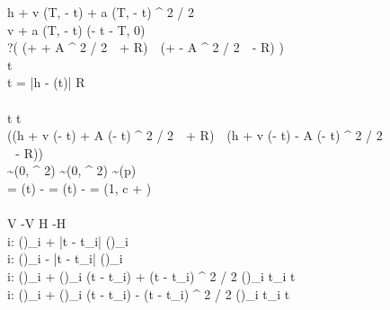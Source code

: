 \begin{figure}
\begin{center}
\begin{sllisting}
      \slind \cahnext \dlassign h + v \cdot \min(T, \catm - t) + a \cdot \min(T, \catm - t) ^ 2 / 2 \seq \\
      \slind
        \cavnext \dlassign v + a \cdot \min(T, \catm - t) \seq
        \catleftnext \dlassign \max(\catm - t - T, 0) \seq \\
      \slind  ?(
        (\cahnext + \cavnext \cdot \catleftnext + A \cdot \catleftnext ^ 2 / 2 \,\geq\, \cahmintmax + R)
        \,\lor\,
        (\cahnext + \cavnext \cdot \catleftnext - A \cdot \catleftnext ^ 2 / 2 \,\leq\, \cahmintmin - R)
      )\\
    \slplant
      \catinit \dlassign t \seq {} \\
    \slsafe
      t = \catm \rightarrow |h - \cahint(t)| \geq R \\
    \slinvariant \\
      \slind t  \land t \leq \catm \ \land \\
      \slind ((h + v \cdot (\catm - t) + A \cdot (\catm - t) ^ 2 / 2 \,\geq\, \cahmintmax + R) \,\lor\,
      (h + v \cdot (\catm - t) - A \cdot (\catm - t) ^ 2 / 2 \,\leq\, \cahmintmin - R)) \\
    \slnoise
      \caEtaOne \sim \slnormal(0, \caSigmaOne ^ 2) \commasep
      \caEtaTwo \sim \slnormal(0, \caSigmaTwo ^ 2) \commasep
      \caEtaThree \sim \slbernouilli(p) \\
    \slobserve
      \caOmegaOne = \cavint(t) - \caEtaOne \commasep
      \caOmegaTwo = \cahint(t) - \caEtaTwo \commasep
      \caOmegaThree = \min(1, c + \caEtaThree) \\
    \slinfer \\
      \slind \cavintmax \slassign V \seq  \cavintmin \slassign -V \seq  \cahintmax \slassign H \seq  \cahintmin \slassign -H \seq \\
      \slind  \cavintmax \slassign \slaggregate i: (\caOmegaOne)_i + \caAint \cdot |t - t_i| \sland (\caEtaOne)_i \seq \\
      \slind  \cavintmin \slassign \slaggregate i: (\caOmegaOne)_i - \caAint \cdot |t - t_i| \sland (\caEtaOne)_i \seq \\
      \slind \cahintmax \slassign \slaggregate i: (\caOmegaTwo)_i + (\cavintmax)_i \cdot (t - t_i) + \caAint \cdot (t - t_i) ^ 2 / 2 \sland (\caEtaTwo)_i \slwhen t_i \leq t \seq \\
      \slind \cahintmin \slassign \slaggregate i: (\caOmegaTwo)_i + (\cavintmin)_i \cdot (t - t_i) - \caAint \cdot (t - t_i) ^ 2 / 2 \sland (\caEtaTwo)_i \slwhen t_i \leq t \seq \\

\end{sllisting}
\end{center}
\end{figure}
